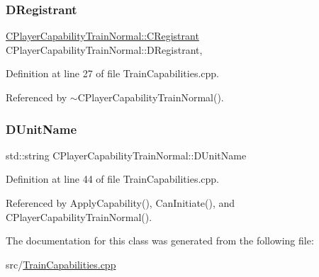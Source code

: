 \subsubsection{\texorpdfstring{D\+Registrant}{DRegistrant}}
{\footnotesize\ttfamily \hyperlink{classCPlayerCapabilityTrainNormal_1_1CRegistrant}{C\+Player\+Capability\+Train\+Normal\+::\+C\+Registrant} C\+Player\+Capability\+Train\+Normal\+::\+D\+Registrant\hspace{0.3cm}{\ttfamily [static]}, {\ttfamily [protected]}}



Definition at line 27 of file Train\+Capabilities.\+cpp.



Referenced by $\sim$\+C\+Player\+Capability\+Train\+Normal().

\hypertarget{classCPlayerCapabilityTrainNormal_aed40686355e78c151910e23ea2d9d32c}{}\label{classCPlayerCapabilityTrainNormal_aed40686355e78c151910e23ea2d9d32c} 
\subsubsection{\texorpdfstring{D\+Unit\+Name}{DUnitName}}
{\footnotesize\ttfamily std\+::string C\+Player\+Capability\+Train\+Normal\+::\+D\+Unit\+Name\hspace{0.3cm}{\ttfamily [protected]}}



Definition at line 44 of file Train\+Capabilities.\+cpp.



Referenced by Apply\+Capability(), Can\+Initiate(), and C\+Player\+Capability\+Train\+Normal().



The documentation for this class was generated from the following file\+:\begin{DoxyCompactItemize}
\item 
src/\hyperlink{TrainCapabilities_8cpp}{Train\+Capabilities.\+cpp}\end{DoxyCompactItemize}
